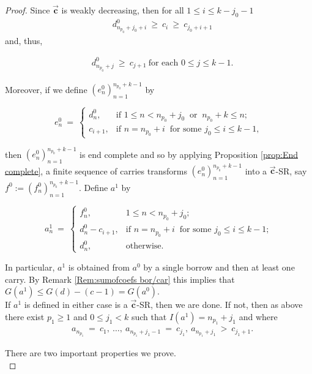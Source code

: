 \documentclass[10pt,a4paper]{amsart}
\newcommand{\vtr}[1]{\vec{\mathbf{#1}}}
\begin{document}
\begin{proof}
  \noindent Since $\vtr{c}$ is weakly decreasing, then for all $1\leq  i\leq k-j_0-1$ 
\begin{align*}
    &d^0_{n_{p_0} +j_0 +i}\ \geq\ c_{i}\ \geq\ c_{j_0+i+1}
 \end{align*}
and, thus,

\begin{align}
    &d^0_{n_{p_0} +j}\ \geq\ c_{j+1}\ \text{for each }0\leq j\leq k-1.
 \end{align}

\noindent Moreover, if we define $(e^0_n)_{n=1}^{n_{p_0} + k-1}$ by

$$e^0_n\ =\ \begin{cases}
        d^0_n, & \text{if  }1\leq n< n_{p_0}+j_0\ \text{ or }\ n_{p_0}+k\leq n;\\
        c_{i+1}, & \text{if  } n=n_{p_0}+i\ \text{ for some }j_0\leq i\leq k-1,
    \end{cases}$$

\noindent then $(e^0_n)_{n=1}^{n_{p_0} + k-1}$ is end complete and so by applying Proposition \textcolor{blue}{\ref{prop:End complete}}, a finite sequence of carries transforms $(e^0_n)_{n=1}^{n_{p_0} + k-1}$ into a $\vtr{c}$-SR, say $f^0:=(f^0_n)_{n=1}^{n_{p_0} + k-1}$. Define $a^1$ by

    $$a_n^{1}\ =\ \begin{cases}
        f^0_n, & 1\leq n< n_{p_0}+j_0;\\
        d^0_n-c_{i+1}, & \text{if } n=n_{p_0}+i\ \text{ for some }j_0\leq i\leq k-1;\\        d^0_n, & \text{otherwise.}
    \end{cases}$$

    \noindent In particular, $a^1$ is obtained from $a^0$ by a single borrow and then at least one carry. By Remark \textcolor{blue}{\ref{Rem:sumofcoefs bor/car}} this implies that $G(a^1)\leq G(d)-(c-1)=G(a^0)$.\\
    
    
If $a^1$ is defined in either case is a $\vtr{c}$-SR, then we are done. If not, then as above there exist $p_1\geq 1$ and $0\leq j_1< k$ such that $I(a^1)=n_{p_1}+j_1$ and where
\begin{align}
    & a_{n_{p_1}}\ =\ c_1,\ \ldots,\ a_{n_{p_1} + j_1 -1}\ =\ c_{j_1},\  a_{n_{p_1}  + j_1}\ >\ c_{j_1+1}. \label{eq:4} 
\end{align}

There are two important properties we prove.\\


\end{proof}
\end{document}
